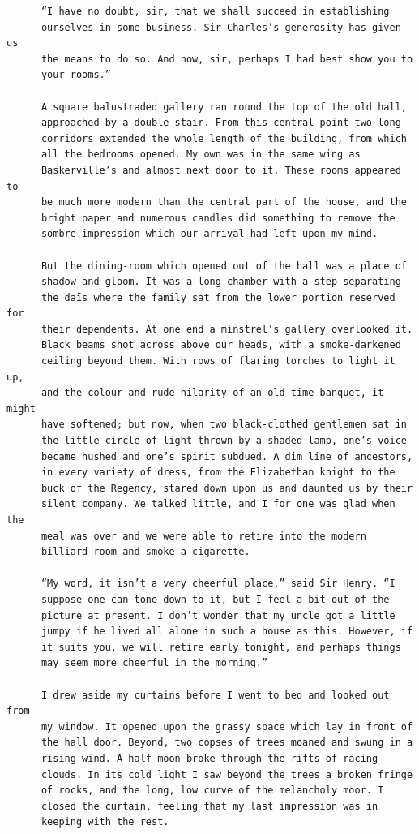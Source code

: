 \documentclass{article}
\begin{document}
\begin{verbatim}
      “I have no doubt, sir, that we shall succeed in establishing
      ourselves in some business. Sir Charles’s generosity has given us
      the means to do so. And now, sir, perhaps I had best show you to
      your rooms.”

      A square balustraded gallery ran round the top of the old hall,
      approached by a double stair. From this central point two long
      corridors extended the whole length of the building, from which
      all the bedrooms opened. My own was in the same wing as
      Baskerville’s and almost next door to it. These rooms appeared to
      be much more modern than the central part of the house, and the
      bright paper and numerous candles did something to remove the
      sombre impression which our arrival had left upon my mind.

      But the dining-room which opened out of the hall was a place of
      shadow and gloom. It was a long chamber with a step separating
      the daïs where the family sat from the lower portion reserved for
      their dependents. At one end a minstrel’s gallery overlooked it.
      Black beams shot across above our heads, with a smoke-darkened
      ceiling beyond them. With rows of flaring torches to light it up,
      and the colour and rude hilarity of an old-time banquet, it might
      have softened; but now, when two black-clothed gentlemen sat in
      the little circle of light thrown by a shaded lamp, one’s voice
      became hushed and one’s spirit subdued. A dim line of ancestors,
      in every variety of dress, from the Elizabethan knight to the
      buck of the Regency, stared down upon us and daunted us by their
      silent company. We talked little, and I for one was glad when the
      meal was over and we were able to retire into the modern
      billiard-room and smoke a cigarette.

      “My word, it isn’t a very cheerful place,” said Sir Henry. “I
      suppose one can tone down to it, but I feel a bit out of the
      picture at present. I don’t wonder that my uncle got a little
      jumpy if he lived all alone in such a house as this. However, if
      it suits you, we will retire early tonight, and perhaps things
      may seem more cheerful in the morning.”

      I drew aside my curtains before I went to bed and looked out from
      my window. It opened upon the grassy space which lay in front of
      the hall door. Beyond, two copses of trees moaned and swung in a
      rising wind. A half moon broke through the rifts of racing
      clouds. In its cold light I saw beyond the trees a broken fringe
      of rocks, and the long, low curve of the melancholy moor. I
      closed the curtain, feeling that my last impression was in
      keeping with the rest.


\end{verbatim}
\end{document}
